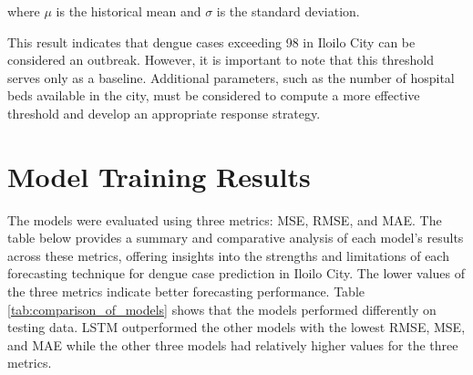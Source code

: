 where \(\mu\) is the historical mean and \(\sigma \) is the standard deviation.

This result indicates that dengue cases exceeding 98 in Iloilo City can be considered an outbreak. However, it is important to note that this threshold serves only as a baseline. Additional parameters, such as the number of hospital beds available in the city, must be considered to compute a more effective threshold and develop an appropriate response strategy.

	
\section{Model Training Results}

The models were evaluated using three metrics: MSE, RMSE, and MAE. The table below provides a summary and comparative analysis of each model’s results across these metrics, offering insights into the strengths and limitations of each forecasting technique for dengue case prediction in Iloilo City. The lower values of the three metrics indicate better forecasting performance. Table \ref{tab:comparison_of_models} shows that the models performed differently on testing data. LSTM outperformed the other models with the lowest RMSE, MSE, and MAE while the other three models had relatively higher values for the three metrics.

\begin{table}[h!]
	\centering
	
	\caption{Comparison of Models}
	\label{tab:comparison_of_models}
\end{table}



